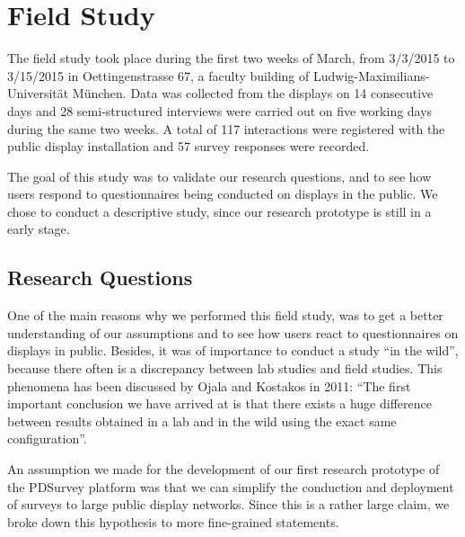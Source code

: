 \section{Field Study}
\label{sec:field-study}


	The field study took place during the first two weeks of March, from 3/3/2015 to 3/15/2015 in Oettingenstrasse 67, a faculty building of Ludwig-Maximilians-Universit\"at M\"unchen. Data was collected from the displays on 14 consecutive days and 28 semi-structured interviews were carried out on five working days during the same two weeks. A total of 117 interactions were registered with the public display installation and 57 survey responses were recorded.

	The goal of this study was to validate our research questions, and to see how users respond to questionnaires being conducted on displays in the public. We chose to conduct a descriptive study, since our research prototype is still in a early stage.




\subsection{Research Questions}

	One of the main reasons why we performed this field study, was to get a better understanding of our assumptions and to see how users react to questionnaires on displays in public. Besides, it was of importance to conduct a study ``in the wild'', because there often is a discrepancy between lab studies and field studies. This phenomena has been discussed by Ojala and Kostakos in 2011: ``The first important conclusion we have arrived at is that there exists a huge difference between results obtained in a lab and in the wild using the exact same configuration''\cite{Ojala2011}.

	An assumption we made for the development of our first research prototype of the PDSurvey platform was that we can simplify the conduction and deployment of surveys to large public display networks. Since this is a rather large claim, we broke down this hypothesis to more fine-grained statements. 

